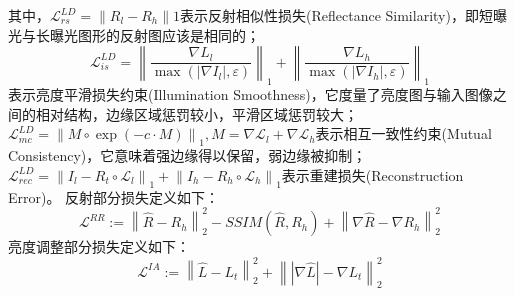 \documentclass[letterpaper,12pt]{article}
\begin{document}
			其中，$\mathcal{L}_{rs}^{LD}=\left\|R_l-R_h\right\|1$表示反射相似性损失(Reflectance Similarity)，即短曝光与长曝光图形的反射图应该是相同的；$$\mathcal{L}_{is}^{LD}=\left\| \frac{\nabla L_{l}}{\max(\left| \nabla I_{l} \right|,\varepsilon)} \right\|_{1} + \left\| {\frac{\nabla L_{h}}{\max (\left| \nabla I_{h} \right| ,\varepsilon)}}\right\|_{1}$$表示亮度平滑损失约束(Illumination Smoothness)，它度量了亮度图与输入图像之间的相对结构，边缘区域惩罚较小，平滑区域惩罚较大；$\mathcal{L}_{mc}^{LD}={\left\|M\circ\exp(-c\cdot M)\right \|}_{1}, M=\nabla \mathcal{L}_{l}+\nabla \mathcal{L}_{h}$表示相互一致性约束(Mutual Consistency)，它意味着强边缘得以保留，弱边缘被抑制；$\mathcal{L}_{rec}^{LD}={\left \| I_l-R_t \circ \mathcal{L}_l\right\|}_{1} + {\left \| I_h-R_h \circ \mathcal{L}_h\right\|}_{1}$表示重建损失(Reconstruction Error)。
			反射部分损失定义如下：
			\begin{equation}
				\mathcal{L}^{RR}:={\left\| \hat{R}-R_{h} \right\|}^{2}_{2} - SSIM(\hat{R},R_{h}) + {\left\|\nabla\hat{R}-\nabla R_{h} \right\|}^{2}_{2}
			\end{equation}
			亮度调整部分损失定义如下：
			\begin{equation}
				\mathcal{L}^{IA}:={\left\| \hat{L}-L_{t} \right\|}^{2}_{2} + {\left\| \left|\nabla\hat{L}\right|-\nabla L_{t} \right\|}^{2}_{2}
			\end{equation}
			
\end{document}
